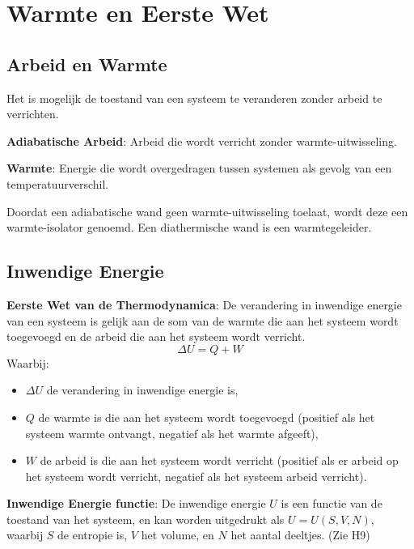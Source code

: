 \section{Warmte en Eerste Wet}
\subsection{Arbeid en Warmte}
Het is mogelijk de toestand van een systeem te veranderen zonder arbeid te verrichten.

\begin{definition}
    \textbf{Adiabatische Arbeid}: Arbeid die wordt verricht zonder warmte-uitwisseling.
\end{definition}
\begin{definition}
    \textbf{Warmte}: Energie die wordt overgedragen tussen systemen als gevolg van een temperatuurverschil.
\end{definition}

Doordat een adiabatische wand geen warmte-uitwisseling toelaat, wordt deze een warmte-isolator genoemd. Een diathermische wand is een warmtegeleider.

\subsection{Inwendige Energie}

\begin{postulate}
    \textbf{Eerste Wet van de Thermodynamica}: De verandering in inwendige energie van een systeem is gelijk aan de som van de warmte die aan het systeem wordt toegevoegd en de arbeid die aan het systeem wordt verricht.
    \begin{equation}
        \Delta U = Q + W
    \end{equation}
    Waarbij:
    \begin{itemize}
        \item $\Delta U$ de verandering in inwendige energie is,
        \item $Q$ de warmte is die aan het systeem wordt toegevoegd (positief als het systeem warmte ontvangt, negatief als het warmte afgeeft),
        \item $W$ de arbeid is die aan het systeem wordt verricht (positief als er arbeid op het systeem wordt verricht, negatief als het systeem arbeid verricht).
    \end{itemize}
\end{postulate}

\begin{definition}
    \textbf{Inwendige Energie functie}: De inwendige energie $U$ is een functie van de toestand van het systeem, en kan worden uitgedrukt als $U = U(S, V, N)$, waarbij $S$ de entropie is, $V$ het volume, en $N$ het aantal deeltjes.
    (Zie H9)
\end{definition}


